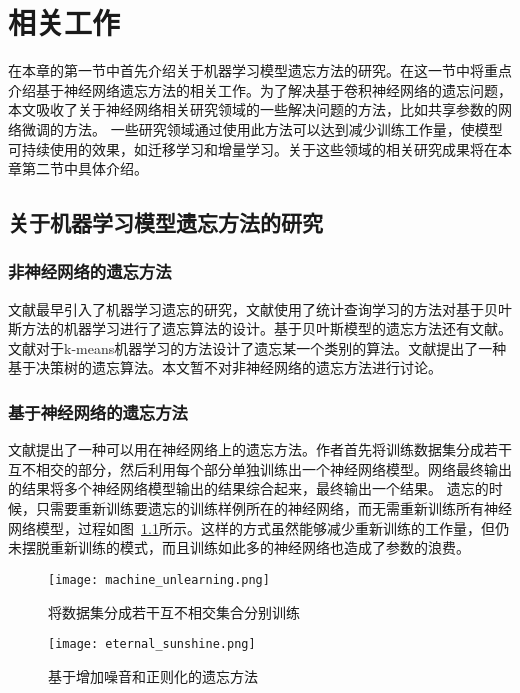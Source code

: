 
\chapter{相关工作}

在本章的第一节中首先介绍关于机器学习模型遗忘方法的研究。在这一节中将重点介绍基于神经网络遗忘方法的相关工作。为了解决基于卷积神经网络的遗忘问题，本文吸收了关于神经网络相关研究领域的一些解决问题的方法，比如共享参数的网络微调的方法。
一些研究领域通过使用此方法可以达到减少训练工作量，使模型可持续使用的效果，如迁移学习和增量学习。关于这些领域的相关研究成果将在本章第二节中具体介绍。

\section{关于机器学习模型遗忘方法的研究}
\subsection{非神经网络的遗忘方法}
文献\cite{yinzhicao2015}最早引入了机器学习遗忘的研究，文献使用了统计查询学习\cite{10.1145/293347.293351}的方法对基于贝叶斯方法的机器学习进行了遗忘算法的设计。基于贝叶斯模型的遗忘方法还有文献\cite{10.1145/3196494.3196517}。
文献\cite{antonio2019}对于k-means机器学习的方法设计了遗忘某一个类别的算法。文献\cite{10.1007/978-3-319-40159-1_19}提出了一种基于决策树的遗忘算法。本文暂不对非神经网络的遗忘方法进行讨论。

\subsection{基于神经网络的遗忘方法}
文献\cite{2019arXiv191203817B}提出了一种可以用在神经网络上的遗忘方法。作者首先将训练数据集分成若干互不相交的部分，然后利用每个部分单独训练出一个神经网络模型。网络最终输出的结果将多个神经网络模型输出的结果综合起来，最终输出一个结果。
遗忘的时候，只需要重新训练要遗忘的训练样例所在的神经网络，而无需重新训练所有神经网络模型，过程如图~\ref{fig:machine_unlearning}所示。这样的方式虽然能够减少重新训练的工作量，但仍未摆脱重新训练的模式，而且训练如此多的神经网络也造成了参数的浪费。
\begin{figure}
    \centering
    \texttt{[image: machine\_unlearning.png]}
    \caption{将数据集分成若干互不相交集合分别训练\cite{2019arXiv191203817B}}
    \label{fig:machine_unlearning}
\end{figure}
\begin{figure}
    \centering
    \texttt{[image: eternal\_sunshine.png]}
    \caption{基于增加噪音和正则化的遗忘方法\cite{2019arXiv191203817B}}
    \label{fig:eternal_sunshine}
\end{figure}

